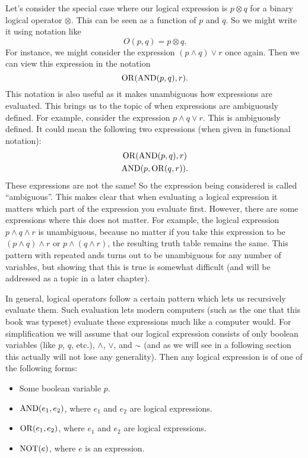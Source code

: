 Let's consider the special case where our logical expression is $p \otimes q$ for a binary logical operator $\otimes$. This can be seen as a function of $p$ and $q$. So we might write it using notation like
\[O(p, q) = p \otimes q.\]
For instance, we might consider the expression $(p \land q) \lor r$ once again. Then we can view this expression in the notation
\[\operatorname{OR}(\operatorname{AND}(p, q), r).\]
This notation is also useful as it makes unambiguous how expressions are evaluated. This brings us to the topic of when expressions are ambiguously defined. For example, consider the expression $p \land q \lor r$. This is ambiguously defined. It could mean the following two expressions (when given in functional notation):
\begin{gather}
\operatorname{OR}(\operatorname{AND}(p, q),r) \\
\operatorname{AND}(p, \operatorname{OR}(q, r)).
\end{gather}
These expressions are not the same! So the expression being considered is called ``ambiguous''. This makes clear that when evaluating a logical expression it matters which part of the expression you evaluate first. However, there are some expressions where this does not matter. For example, the logical expression $p \land q \land r$ is unambiguous, because no matter if you take this expression to be $(p \land q) \land r$ or $p \land (q \land r)$, the resulting truth table remains the same. This pattern with repeated ands turns out to be unambiguous for any number of variables, but showing that this is true is somewhat difficult (and will be addressed as a topic in a later chapter).

In general, logical operators follow a certain pattern which lets us recursively evaluate them. Such evaluation lets modern computers (such as the one that this book was typeset) evaluate these expressions much like a computer would. For simplification we will assume that our logical expression consists of only boolean variables (like $p$, $q$, etc.), $\land$, $\lor$, and $\shortsim$ (and as we will see in a following section this actually will not lose any generality). Then any logical expression is of one of the following forms:

\begin{itemize}
	\item Some boolean variable $p$.
	\item $\operatorname{AND}(e_1, e_2)$, where $e_1$ and $e_2$ are logical expressions.
	\item $\operatorname{OR}(e_1, e_2)$, where $e_1$ and $e_2$ are logical expressions.
	\item $\operatorname{NOT}(e)$, where $e$ is an expression.
\end{itemize}

